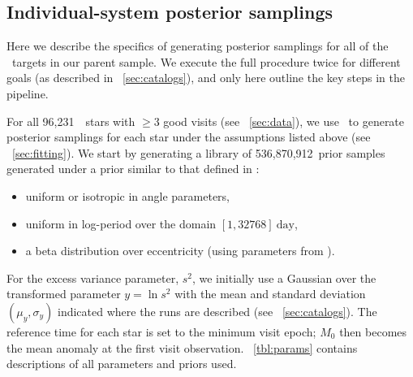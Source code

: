 \documentclass[modern, letterpaper]{aastex62}
\newcommand{\apogee}{\project{\acronym{APOGEE}}}
\newcommand{\thejoker}{\project{The~Joker}}
\newcommand{\nprior}{536,870,912}
\newcommand{\nstars}{96,231}
\begin{document}
\subsection{Individual-system posterior samplings}
\label{sec:samplings}

Here we describe the specifics of generating posterior samplings for all of the
\apogee\ targets in our parent sample.
We execute the full procedure twice for different goals (as described in
\sectionname~\ref{sec:catalogs}), and only here outline the key steps in the
pipeline.

For all \nstars\ \apogee\ stars with $\geq 3$ good visits (see
\sectionname~\ref{sec:data}), we use \thejoker\ to generate posterior samplings
for each star under the assumptions listed above (see
\sectionname~\ref{sec:fitting}).
We start by generating a library of \nprior\ prior samples generated under a
prior similar to that defined in \citet{Price-Whelan:2017}:
\begin{itemize}
    \item uniform or isotropic in angle parameters,
    \item uniform in log-period over the domain $[1,32768]~\textrm{day}$,
    \item a beta distribution over eccentricity (using parameters from
    \citealt{Kipping:2013}).
\end{itemize}
For the excess variance parameter, $s^2$, we initially use a Gaussian over the
transformed parameter $y = \ln s^2$ with the mean and standard deviation
$(\mu_y, \sigma_y)$ indicated where the runs are described (see
\sectionname~\ref{sec:catalogs}).
The reference time for each star is set to the minimum visit epoch; $M_0$ then
becomes the mean anomaly at the first visit observation.
\tablename~\ref{tbl:params} contains descriptions of all parameters and priors
used.
\end{document}
